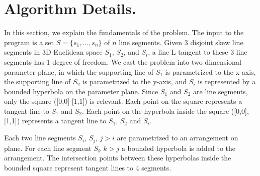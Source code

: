\section{Algorithm Details.}
In this section, we explain the fundamentals of the problem.\newline
The input to the program is a set $S=\{s_1,\ldots,s_n\}$ of $n$ line segments.\newline
Given 3 disjoint skew line segments in 3D Euclidean space $S_1$, $S_2$, and $S_i$, a line L tangent to these 3 line segments has 1 degree of freedom.\newline
We cast the problem into two dimensional parameter plane, in which the supporting line of $S_1$ is parametrized to the x-axis, the supporting line of $S_2$ is parametrized to the y-axis, and $S_i$ is represented by a bounded hyperbola on the parameter plane.
Since $S_1$ and $S_2$ are line segments, only the square ([0,0] [1,1]) is relevant. Each point on the square represents a tangent line to $S_1$ and $S_2$. Each point on the hyperbola inside the square ([0,0], [1,1]) represents a tangent line to $S_1$, $S_2$ and $S_i$.

Each two line segments $S_i$, $S_j$, $j>i$ are parametrized to an arrangement on plane. For each line segment $S_k$ $k>j$  a bounded hyperbola is added to the arrangement. The intersection points between these hyperbolas inside the bounded square represent tangent lines to 4 segments.

